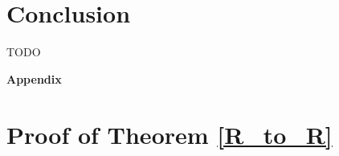 \documentclass{article}
\begin{document}
    \section{Conclusion}
        TODO


  

\newpage

\begin{center}
    \LARGE \textbf{Appendix}
\end{center}
\normalsize

\appendix

    \section{Proof of Theorem \ref{R_to_R}} \label{pr_R_to_R}
\end{document}
